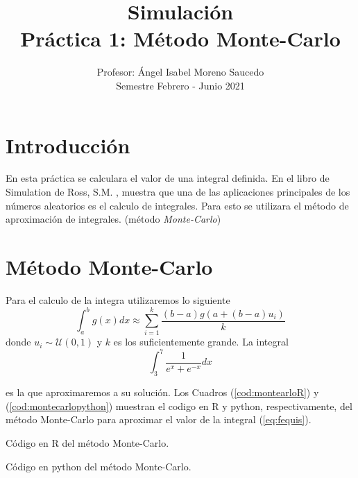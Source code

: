 

\title{Simulación \\ Práctica 1: Método Monte-Carlo}
\author{Profesor: Ángel Isabel Moreno Saucedo \\ Semestre Febrero - Junio 2021}
\date{}



\maketitle

\section{Introducci\'{o}n} \label{sec:intro}

En esta práctica se calculara el valor de una integral definida. En el libro de Simulation de Ross, S.M. \citep{ross1997simulation}, muestra que una de las aplicaciones principales de los números aleatorios es el calculo de integrales. Para esto se utilizara el método de aproximación de integrales. (método \emph{Monte-Carlo})

\section{Método Monte-Carlo} \label{sec:montecarlo}

Para el calculo de la integra utilizaremos lo siguiente
\begin{equation}
\int_a^b g(x) dx \approx \sum_{i = 1}^{k} \frac{(b - a)g(a + (b - a)u_i)}{k} \label{eq:aproxmontecarlo}
\end{equation}
donde $u_i\sim \mathcal{U}(0, 1)$ y $k$ es los suficientemente grande. La integral
\begin{equation}
\int_3^7 \frac{1}{e^x + e^{-x}} dx \label{eq:fequis}
\end{equation}

es la que aproximaremos a su solución. Los Cuadros (\ref{cod:montearloR}) y (\ref{cod:montecarlopython}) muestran el codigo en R y python, respectivamente, del método Monte-Carlo para aproximar el valor de la integral (\ref{eq:fequis}).

\begin{table}[htpb]
	
	\caption{Código en R del método Monte-Carlo.}
	\label{cod:montearloR}
\end{table}

\begin{table}[htpb]
	
	\caption{Código en python del método Monte-Carlo.}
	\label{cod:montecarlopython}
\end{table}

